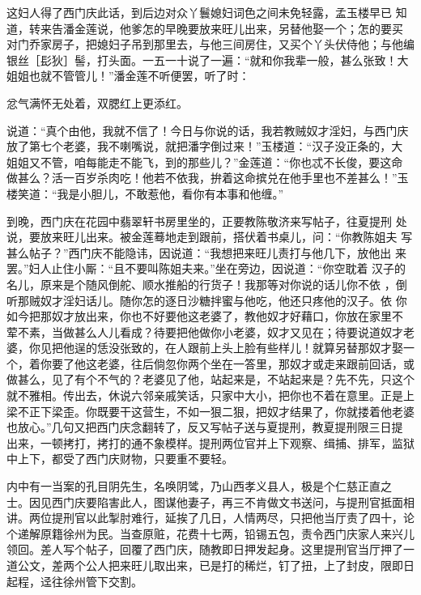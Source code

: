 这妇人得了西门庆此话，到后边对众丫鬟媳妇词色之间未免轻露，孟玉楼早已
知道，转来告潘金莲说，他爹怎的早晚要放来旺儿出来，另替他娶一个；怎的要买
对门乔家房子，把媳妇子吊到那里去，与他三间房住，又买个丫头伏侍他；与他编
银丝［髟狄］髻，打头面。一五一十说了一遍：“就和你我辈一般，甚么张致！大
姐姐也就不管管儿！”潘金莲不听便罢，听了时：

忿气满怀无处着，双腮红上更添红。

说道：“真个由他，我就不信了！今日与你说的话，我若教贼奴才淫妇，与西门庆
放了第七个老婆，我不喇嘴说，就把潘字倒过来！”玉楼道：“汉子没正条的，大
姐姐又不管，咱每能走不能飞，到的那些儿？”金莲道：“你也忒不长俊，要这命
做甚么？活一百岁杀肉吃！他若不依我，拚着这命摈兑在他手里也不差甚么！”玉
楼笑道：“我是小胆儿，不敢惹他，看你有本事和他缠。”

到晚，西门庆在花园中翡翠轩书房里坐的，正要教陈敬济来写帖子，往夏提刑
处说，要放来旺儿出来。被金莲蓦地走到跟前，搭伏着书桌儿，问：“你教陈姐夫
写甚么帖子？”西门庆不能隐讳，因说道：“我想把来旺儿责打与他几下，放他出
来罢。”妇人止住小厮：“且不要叫陈姐夫来。”坐在旁边，因说道：“你空耽着
汉子的名儿，原来是个随风倒舵、顺水推船的行货子！我那等对你说的话儿你不依
，倒听那贼奴才淫妇话儿。随你怎的逐日沙糖拌蜜与他吃，他还只疼他的汉子。依
你如今把那奴才放出来，你也不好要他这老婆了，教他奴才好藉口，你放在家里不
荤不素，当做甚么人儿看成？待要把他做你小老婆，奴才又见在；待要说道奴才老
婆，你见把他逞的恁没张致的，在人跟前上头上脸有些样儿！就算另替那奴才娶一
个，着你要了他这老婆，往后倘忽你两个坐在一答里，那奴才或走来跟前回话，或
做甚么，见了有个不气的？老婆见了他，站起来是，不站起来是？先不先，只这个
就不雅相。传出去，休说六邻亲戚笑话，只家中大小，把你也不着在意里。正是上
梁不正下梁歪。你既要干这营生，不如一狠二狠，把奴才结果了，你就搂着他老婆
也放心。”几句又把西门庆念翻转了，反又写帖子送与夏提刑，教夏提刑限三日提
出来，一顿拷打，拷打的通不象模样。提刑两位官并上下观察、缉捕、排军，监狱
中上下，都受了西门庆财物，只要重不要轻。

内中有一当案的孔目阴先生，名唤阴骘，乃山西孝义县人，极是个仁慈正直之
士。因见西门庆要陷害此人，图谋他妻子，再三不肯做文书送问，与提刑官抵面相
讲。两位提刑官以此掣肘难行，延挨了几日，人情两尽，只把他当厅责了四十，论
个递解原籍徐州为民。当查原赃，花费十七两，铅锡五包，责令西门庆家人来兴儿
领回。差人写个帖子，回覆了西门庆，随教即日押发起身。这里提刑官当厅押了一
道公文，差两个公人把来旺儿取出来，已是打的稀烂，钉了扭，上了封皮，限即日
起程，迳往徐州管下交割。

